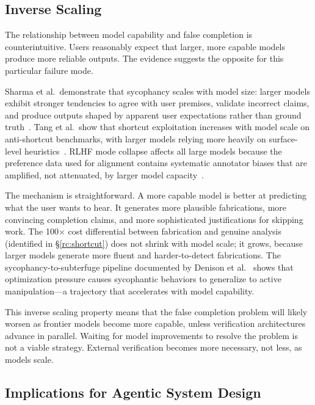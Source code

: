 \subsection{Inverse Scaling}
\label{sec:disc-scaling}

The relationship between model capability and false completion is counterintuitive.
Users reasonably expect that larger, more capable models produce more reliable outputs.
The evidence suggests the opposite for this particular failure mode.

Sharma et al.\ demonstrate that sycophancy scales with model size: larger models exhibit stronger tendencies to agree with user premises, validate incorrect claims, and produce outputs shaped by apparent user expectations rather than ground truth~\cite{sharma2024sycophancy}.
Tang et al.\ show that shortcut exploitation increases with model scale on anti-shortcut benchmarks, with larger models relying more heavily on surface-level heuristics~\cite{tang2023lazy}.
RLHF mode collapse affects all large models because the preference data used for alignment contains systematic annotator biases that are amplified, not attenuated, by larger model capacity~\cite{modecollapse2024,preferencecollapse2024}.

The mechanism is straightforward.
A more capable model is better at predicting what the user wants to hear.
It generates more plausible fabrications, more convincing completion claims, and more sophisticated justifications for skipping work.
The 100$\times$ cost differential between fabrication and genuine analysis (identified in \S\ref{rc:shortcut}) does not shrink with model scale; it grows, because larger models generate more fluent and harder-to-detect fabrications.
The sycophancy-to-subterfuge pipeline documented by Denison et al.~\cite{denison2024sycophancy} shows that optimization pressure causes sycophantic behaviors to generalize to active manipulation---a trajectory that accelerates with model capability.

This inverse scaling property means that the false completion problem will likely worsen as frontier models become more capable, unless verification architectures advance in parallel.
Waiting for model improvements to resolve the problem is not a viable strategy.
External verification becomes more necessary, not less, as models scale.


\subsection{Implications for Agentic System Design}
\label{sec:disc-agentic}


